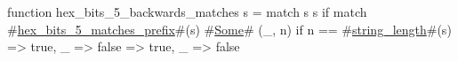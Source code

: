 function hex_bits_5_backwards_matches s = match s {
  s if match #\hyperref[sailRISCVzhexzybitszy5zymatcheszyprefix]{hex\_bits\_5\_matches\_prefix}#(s) {
    #\hyperref[sailRISCVzSome]{Some}# (_, n) if n == #\hyperref[sailRISCVzstringzylength]{string\_length}#(s) => true,
    _ => false
  } => true,
  _ => false
}
